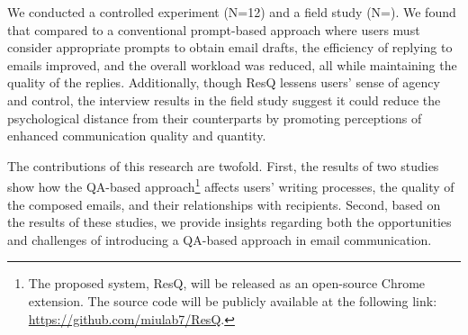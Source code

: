 We conducted a controlled experiment (N=12) and a field study (N=).
We found that compared to a conventional prompt-based approach where users must consider appropriate prompts to obtain email drafts, the efficiency of replying to emails improved, and the overall workload was reduced, all while maintaining the quality of the replies.
Additionally, though ResQ lessens users’ sense of agency and control, the interview results in the field study suggest it could reduce the psychological distance from their counterparts by promoting perceptions of enhanced communication quality and quantity.

The contributions of this research are twofold. 
First, the results of two studies show how the QA-based approach\footnote{The proposed system, ResQ, will be released as an open-source Chrome extension. The source code will be publicly available at the following link: \url{https://github.com/miulab7/ResQ}.} 
affects users’ writing processes, the quality of the composed emails, and their relationships with recipients. 
Second, based on the results of these studies, we provide insights regarding both the opportunities and challenges of introducing a QA-based approach in email communication.

